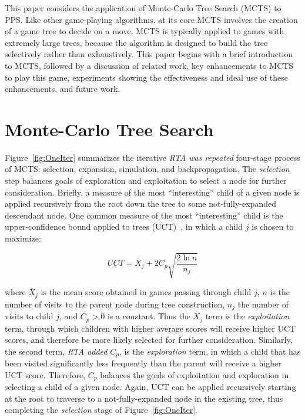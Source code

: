 \documentclass[letterpaper]{article}
\begin{document}
This paper considers the application of Monte-Carlo Tree Search (MCTS) to PPS. Like other game-playing algorithms, at its core MCTS involves the creation of a game tree to decide on a move. MCTS is typically applied to games with extremely large trees, because the algorithm is designed to build the tree selectively rather than exhaustively. This paper begins with a brief introduction to MCTS, followed by a discussion of related work, key enhancements to MCTS to play this game, experiments showing the effectiveness and ideal use of these enhancements, and future work.

\section{Monte-Carlo Tree Search}

Figure~\ref{fig:OneIter} summarizes the iterative {\it RTA was repeated} four-stage process of MCTS: selection, expansion, simulation, and backpropagation. The {\it selection} step balances goals of exploration and exploitation to select a node for further consideration. Briefly, a measure of the most ``interesting'' child of a given node is applied recursively from the root down the tree to some not-fully-expanded descendant node. One common measure of the most ``interesting'' child is the upper-confidence bound applied to trees (UCT)~\cite{kocsis2006improved}, in which a child $j$ is chosen to maximize:

\begin{equation} \label{eq:UCT}
UCT = \overline{X}_j + 2C_p\sqrt{\frac{2\ln{n}}{n_j}}
\end{equation}

\noindent where $\overline{X}_j$ is the mean score obtained in games passing through child $j$, $n$ is the number of visits to the parent node during tree construction, $n_j$ the number of visits to child $j$, and $C_p > 0$ is a constant. Thus the $\overline{X}_j$ term is the {\it exploitation} term, through which children with higher average scores will receive higher UCT scores, and therefore be more likely selected for further consideration. Similarly, the second term, {\it RTA added} $C_p$, is the {\it exploration} term, in which a child that has been visited significantly less frequently than the parent will receive a higher UCT score. Therefore, $C_p$ balances the goals of exploitation and exploration in selecting a child of a given node. Again, UCT can be applied recursively starting at the root to traverse to a not-fully-expanded node in the existing tree, thus completing the {\it selection} stage of Figure~\ref{fig:OneIter}.
\end{document}
